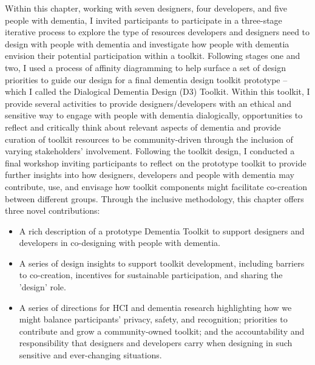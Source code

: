 Within this chapter, working with seven designers, four developers, and five people with dementia, I invited participants to participate in a three-stage iterative process to explore the type of resources developers and designers need to design with people with dementia and investigate how people with dementia envision their potential participation within a toolkit. Following stages one and two, I used a process of affinity diagramming to help surface a set of design priorities to guide our design for a final dementia design toolkit prototype – which I called the Dialogical Dementia Design (D3) Toolkit. Within this toolkit, I provide several activities to provide designers/developers with an ethical and sensitive way to engage with people with dementia dialogically, opportunities to reflect and critically think about relevant aspects of dementia and provide curation of toolkit resources to be community-driven through the inclusion of varying stakeholders' involvement. Following the toolkit design, I conducted a final workshop inviting participants to reflect on the prototype toolkit to provide further insights into how designers, developers and people with dementia may contribute, use, and envisage how toolkit components might facilitate co-creation between different groups. Through the inclusive methodology, this chapter offers three novel contributions:

\begin{itemize}
    \item  A rich description of a prototype Dementia Toolkit to support designers and developers in co-designing with people with dementia.
    \item  A series of design insights to support toolkit development, including barriers to co-creation, incentives for sustainable participation, and sharing the 'design' role.
    \item A series of directions for HCI and dementia research highlighting how we might balance participants' privacy, safety, and recognition; priorities to contribute and grow a community-owned toolkit; and the accountability and responsibility that designers and developers carry when designing in such sensitive and ever-changing situations.
\end{itemize}


